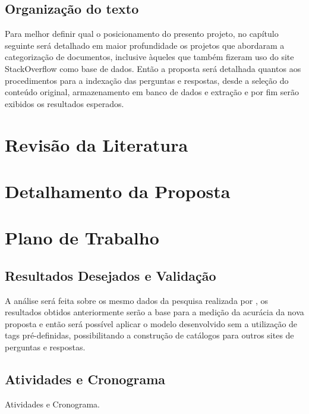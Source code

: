 \documentclass[10pt,a4paper,final]{article}
\begin{document}
   \subsection{Organização do texto}

Para melhor definir qual o posicionamento do presento projeto, no capítulo seguinte será detalhado em maior profundidade os projetos que abordaram a categorização de documentos, inclusive àqueles que também fizeram uso do site StackOverflow como base de dados. Então a proposta será detalhada quantos aos procedimentos para a indexação das perguntas e respostas, desde a seleção do conteúdo original, armazenamento em banco de dados e extração e por fim serão exibidos os resultados esperados.

 \section{Revisão da Literatura}
   


   \section{Detalhamento da Proposta}




  
    \section{Plano de Trabalho}



    \subsection{Resultados Desejados e Validação}
    
A análise será feita sobre os mesmo dados da pesquisa realizada por \cite{Arash2016}, os resultados obtidos anteriormente serão a base para a medição da acurácia da nova proposta e então será possível aplicar o modelo desenvolvido sem a utilização de tags pré-definidas, possibilitando a construção de catálogos para outros sites de perguntas e respostas.
 
    \subsection{Atividades e Cronograma}
    
Atividades e Cronograma.

\nocite{Joorabchi2015}
\nocite{Manning2009}
\nocite{Mihalcea2007}
\nocite{Mihalcea2001}
\nocite{Mihalcea2004}
\nocite{Miotto2013}
\nocite{Posch2014}
\nocite{Roul2015}
\nocite{Udell2005}

{}  


    
\end{document}
